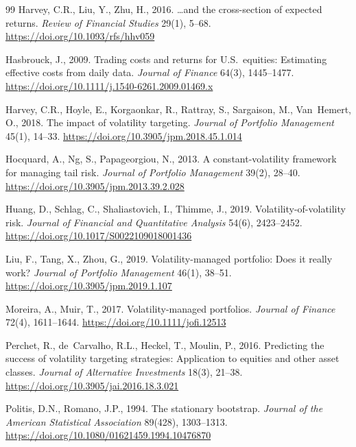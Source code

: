 \documentclass[12pt,a4paper]{article}
\begin{document}
\begin{thebibliography}{99}
Harvey, C.R., Liu, Y., Zhu, H., 2016. \ldots and the cross-section of expected returns. \textit{Review of Financial Studies} 29(1), 5--68. \url{https://doi.org/10.1093/rfs/hhv059}

Hasbrouck, J., 2009. Trading costs and returns for U.S.\ equities: Estimating effective costs from daily data. \textit{Journal of Finance} 64(3), 1445--1477. \url{https://doi.org/10.1111/j.1540-6261.2009.01469.x}

Harvey, C.R., Hoyle, E., Korgaonkar, R., Rattray, S., Sargaison, M., Van~Hemert, O., 2018. The impact of volatility targeting. \textit{Journal of Portfolio Management} 45(1), 14--33. \url{https://doi.org/10.3905/jpm.2018.45.1.014}

Hocquard, A., Ng, S., Papageorgiou, N., 2013. A constant-volatility framework for managing tail risk. \textit{Journal of Portfolio Management} 39(2), 28--40. \url{https://doi.org/10.3905/jpm.2013.39.2.028}

Huang, D., Schlag, C., Shaliastovich, I., Thimme, J., 2019. Volatility-of-volatility risk. \textit{Journal of Financial and Quantitative Analysis} 54(6), 2423--2452. \url{https://doi.org/10.1017/S0022109018001436}

Liu, F., Tang, X., Zhou, G., 2019. Volatility-managed portfolio: Does it really work? \textit{Journal of Portfolio Management} 46(1), 38--51. \url{https://doi.org/10.3905/jpm.2019.1.107}

Moreira, A., Muir, T., 2017. Volatility-managed portfolios. \textit{Journal of Finance} 72(4), 1611--1644. \url{https://doi.org/10.1111/jofi.12513}

Perchet, R., de~Carvalho, R.L., Heckel, T., Moulin, P., 2016. Predicting the success of volatility targeting strategies: Application to equities and other asset classes. \textit{Journal of Alternative Investments} 18(3), 21--38. \url{https://doi.org/10.3905/jai.2016.18.3.021}

Politis, D.N., Romano, J.P., 1994. The stationary bootstrap. \textit{Journal of the American Statistical Association} 89(428), 1303--1313. \url{https://doi.org/10.1080/01621459.1994.10476870}

\end{thebibliography}
\end{document}
